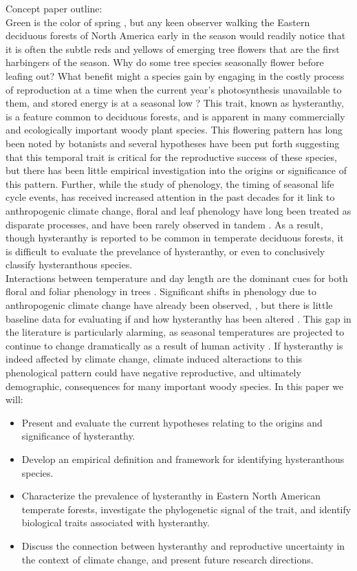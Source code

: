 \documentclass{article}\usepackage[]{graphicx}\usepackage[]{color}
\begin{document}
Concept paper outline:\\
\indent Green is the color of spring \citep{Shwartz1998}, but any keen observer walking the Eastern deciduous forests of North America early in the season would readily notice that it is often the subtle reds and yellows of emerging tree flowers that are the first harbingers of the season. Why do some tree species seasonally flower before leafing out? What benefit might a species gain by engaging in the costly process of reproduction at a time when the current year's photosynthesis unavailable to them, and stored energy is at a seasonal low \citep{Hoch2003,Pfanz2002}? This trait, known as hysteranthy, is a feature common to deciduous forests, and is apparent in many commercially and ecologically important woody plant species. This flowering pattern has long been noted by botanists \citep{Rathcke1985} and several hypotheses have been put forth suggesting that this temporal trait is critical for the reproductive success of these species, but there has been little empirical investigation into the origins or significance of this pattern. Further, while the study of phenology, the timing of seasonal life cycle events, has received increased attention in the past decades for it link to anthropogenic climate change, floral and leaf phenology have long been treated as disparate processes, and have been rarely observed in tandem \citep{Wolkovich2014}. As a result, though   hysteranthy is reported to be common in temperate deciduous forests, it is difficult to evaluate the prevelance of hysteranthy, or even to conclusively classify hysteranthous species.\\
\indent Interactions between temperature and day length are the dominant cues for both floral and foliar phenology in trees \citep{Forrest2010}. Significant shifts in phenology due to anthropogenic climate change have already been observed, \citep{Menzel2006}, but there is little baseline data for evaluating if and how hysteranthy has been altered \citep{Lechowicz1995}. This gap in the literature is particularly alarming, as seasonal temperatures are projected to continue to change dramatically as a result of human activity \citep{Raftery2017}. If hysteranthy is indeed affected by climate change, climate induced alteractions to this phenological pattern could have negative reproductive, and ultimately demographic, consequences for many important woody species. In this paper we will:
\begin{itemize}
\item Present and evaluate the current hypotheses relating to the origins and significance of hysteranthy. 
\item Develop an empirical definition and framework for identifying hysteranthous species.
\item Characterize the prevalence of hysteranthy in Eastern North American temperate forests, investigate the phylogenetic signal of the trait, and identify biological traits associated with hysteranthy.
\item  Discuss the connection between hysteranthy and reproductive uncertainty in the context of climate change, and present future research directions.
\end{itemize}
\end{document}
